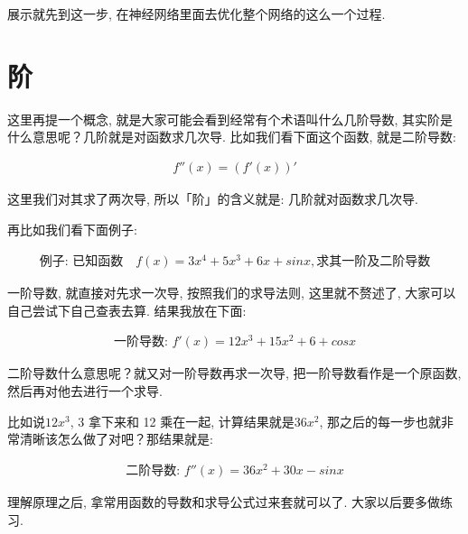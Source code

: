 展示就先到这一步, 在神经网络里面去优化整个网络的这么一个过程. 

\section{阶}

这里再提一个概念, 就是大家可能会看到经常有个术语叫什么几阶导数, 其实阶是什么意思呢？几阶就是对函数求几次导. 比如我们看下面这个函数, 就是二阶导数: 

\begin{align*}
  f''(x) = (f'(x))'
\end{align*}

这里我们对其求了两次导, 所以「阶」的含义就是: 几阶就对函数求几次导. 

再比如我们看下面例子: 

\begin{align*}
  \mbox{例子: 已知函数} \quad f(x) = 3x^4 + 5x^3 + 6x + sinx, \mbox{求其一阶及二阶导数}
\end{align*}

一阶导数, 就直接对先求一次导, 按照我们的求导法则, 这里就不赘述了, 大家可以自己尝试下自己查表去算. 结果我放在下面: 

\begin{align*}
  \mbox{一阶导数: }f'(x) = 12x^3 + 15x^2 + 6 + cosx
\end{align*}

二阶导数什么意思呢？就又对一阶导数再求一次导, 把一阶导数看作是一个原函数, 然后再对他去进行一个求导. 

比如说$12x^3$, 3 拿下来和 12 乘在一起, 计算结果就是$36x^2$, 那之后的每一步也就非常清晰该怎么做了对吧？那结果就是: 

\begin{align*}
  \mbox{二阶导数: } f''(x) = 36x^2 + 30x - sinx
\end{align*}

理解原理之后, 拿常用函数的导数和求导公式过来套就可以了. 大家以后要多做练习. 
